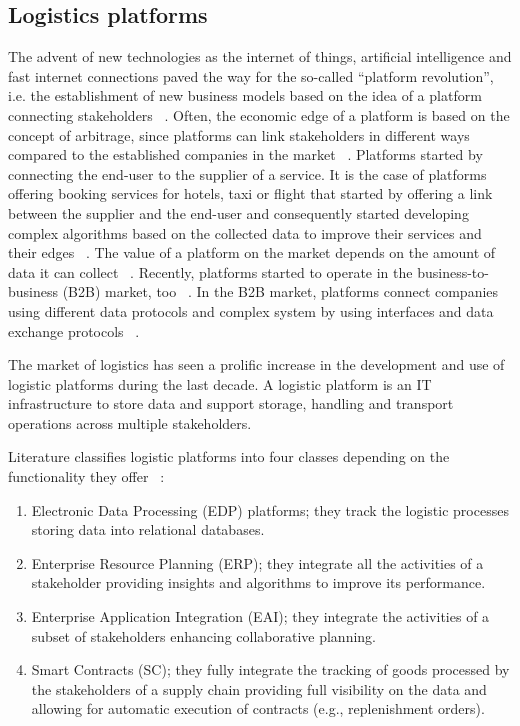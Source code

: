 \subsection{Logistics platforms} \label{secLogPlatform}
The advent of new technologies as the internet of things, artificial intelligence and fast internet connections paved the way for the so-called “platform revolution”, i.e. the establishment of new business models based on the idea of a platform connecting stakeholders ~\cite{Nambisan2019}. Often, the economic edge of a platform is based on the concept of arbitrage, since platforms can link stakeholders in different ways compared to the established companies in the market ~\cite{Dana2003,Kenney2016}. Platforms started by connecting the end-user to the supplier of a service. It is the case of platforms offering booking services for hotels, taxi or flight that started by offering a link between the supplier and the end-user and consequently started developing complex algorithms based on the collected data to improve their services and their edges ~\cite{Benjaafar2019, Guda2019}. The value of a platform on the market depends on the amount of data it can collect ~\cite{Guda2019}. Recently, platforms started to operate in the business-to-business (B2B) market, too ~\cite{Huang2013}.  In the B2B market, platforms connect companies using different data protocols and complex system by using interfaces and data exchange protocols ~\cite{Yu2007}. \par

The market of logistics has seen a prolific increase in the development and use of logistic platforms during the last decade. A logistic platform is an IT infrastructure to store data and support storage, handling and transport operations across multiple stakeholders.\par

Literature classifies logistic platforms into four classes depending on the functionality they offer ~\cite{Xiu2010}:

\begin{enumerate}
    \item Electronic Data Processing (EDP) platforms; they track the logistic processes storing data into relational databases.
    \item Enterprise Resource Planning (ERP); they integrate all the activities of a stakeholder providing insights and algorithms to improve its performance.
    \item Enterprise Application Integration (EAI); they integrate the activities of a subset of stakeholders enhancing collaborative planning.
    \item Smart Contracts (SC); they fully integrate the tracking of goods processed by the stakeholders of a supply chain providing full visibility on the data and allowing for automatic execution of contracts (e.g., replenishment orders).

\end{enumerate}

